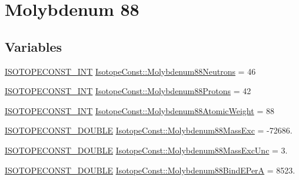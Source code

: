 \hypertarget{group___isotope_const-_molybdenum-_mo88}{}\section{Molybdenum 88}
\label{group___isotope_const-_molybdenum-_mo88}
\subsection*{Variables}
\begin{DoxyCompactItemize}
\item 
\mbox{\hyperlink{group___isotope_const-_macros_ga5f18360b3e99483a35c32d789e62621c}{I\+S\+O\+T\+O\+P\+E\+C\+O\+N\+S\+T\+\_\+\+I\+NT}} \mbox{\hyperlink{group___isotope_const-_molybdenum-_mo88_gad82dcbb17ee2e55c04152fe41c59393e}{Isotope\+Const\+::\+Molybdenum88\+Neutrons}} = 46
\item 
\mbox{\hyperlink{group___isotope_const-_macros_ga5f18360b3e99483a35c32d789e62621c}{I\+S\+O\+T\+O\+P\+E\+C\+O\+N\+S\+T\+\_\+\+I\+NT}} \mbox{\hyperlink{group___isotope_const-_molybdenum-_mo88_gaee05d61cd7919875208b8f663c99e134}{Isotope\+Const\+::\+Molybdenum88\+Protons}} = 42
\item 
\mbox{\hyperlink{group___isotope_const-_macros_ga5f18360b3e99483a35c32d789e62621c}{I\+S\+O\+T\+O\+P\+E\+C\+O\+N\+S\+T\+\_\+\+I\+NT}} \mbox{\hyperlink{group___isotope_const-_molybdenum-_mo88_ga85caa5f1b48fb4f90f1caf806d083e82}{Isotope\+Const\+::\+Molybdenum88\+Atomic\+Weight}} = 88
\item 
\mbox{\hyperlink{group___isotope_const-_macros_ga8f45a7272ce02c0b4c65c44636ed719a}{I\+S\+O\+T\+O\+P\+E\+C\+O\+N\+S\+T\+\_\+\+D\+O\+U\+B\+LE}} \mbox{\hyperlink{group___isotope_const-_molybdenum-_mo88_ga45735d259c779d82e5d1526d39fac40e}{Isotope\+Const\+::\+Molybdenum88\+Mass\+Exc}} = -\/72686.
\item 
\mbox{\hyperlink{group___isotope_const-_macros_ga8f45a7272ce02c0b4c65c44636ed719a}{I\+S\+O\+T\+O\+P\+E\+C\+O\+N\+S\+T\+\_\+\+D\+O\+U\+B\+LE}} \mbox{\hyperlink{group___isotope_const-_molybdenum-_mo88_gaea113ef4dcfb621504161639225e0d8e}{Isotope\+Const\+::\+Molybdenum88\+Mass\+Exc\+Unc}} = 3.
\item 
\mbox{\hyperlink{group___isotope_const-_macros_ga8f45a7272ce02c0b4c65c44636ed719a}{I\+S\+O\+T\+O\+P\+E\+C\+O\+N\+S\+T\+\_\+\+D\+O\+U\+B\+LE}} \mbox{\hyperlink{group___isotope_const-_molybdenum-_mo88_ga8d099a865721214891f3ed5abb41bf88}{Isotope\+Const\+::\+Molybdenum88\+Bind\+E\+PerA}} = 8523.
\item 

\end{DoxyCompactItemize}
